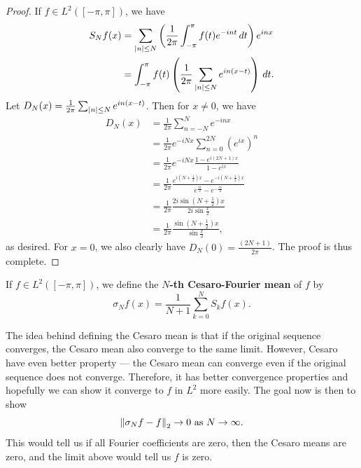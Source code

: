 \documentclass[a4paper]{article}
\begin{document}
\begin{proof}
  If $f \in L^2([- \pi, \pi])$, we have
  \[
    \begin{aligned}
      S_N f(x)
       & = \sum_{\left\lvert n\right\rvert \leq N} \left( \frac{1}{2\pi}
      \int_{- \pi}^\pi f(t) e^{- i n t} \, d t \right) e^{i n x} \\
       & = \int_{-\pi}^\pi f(t) \left( \frac{1}{2\pi}
      \sum_{\left\lvert n\right\rvert \leq N} e^{i n (x - t)} \right) \, d t.
    \end{aligned}
  \]
  Let $D_N(x) = \frac{1}{2\pi}
    \sum_{\left\lvert n\right\rvert \leq N} e^{i n (x - t)}$.
  Then for $x \neq 0$, we have
  \[
    \begin{aligned}
      D_N(x)
       & = \frac{1}{2\pi} \sum_{n=-N}^{N}
      e^{- i n x}                                                             \\
       & = \frac{1}{2\pi} e^{- i N x} \sum_{n=0}^{2N}
      \left( e^{i x} \right)^n                                                \\
       & = \frac{1}{2\pi} e^{- i N x}
      \frac{1 - e^{i (2N+1) x}}{1 - e^{i x}}                                  \\
       & = \frac{1}{2\pi} \frac{e^{i (N + \frac{1}{2}) x}
                            - e^{- i (N + \frac{1}{2}) x}}{e^{\frac{ix}{2}} -
                            e^{-\frac{ix}{2}}} \\
       & = \frac{1}{2\pi} \frac{2 i \sin (N + \frac{1}{2})x}
                          {2i \sin \frac{x}{2}}                   \\
       & = \frac{1}{2\pi} \frac{\sin (N + \frac{1}{2})x}
                          {\sin \frac{x}{2}},
    \end{aligned}
  \]
  as desired. For $x = 0$, we also clearly have
  $D_N(0) = \frac{(2N+1)}{2\pi}$. The proof is thus
  complete.
\end{proof}

\begin{defi}
  If $f \in L^2([-\pi, \pi])$, we define the
  \textbf{$N$-th Cesaro-Fourier mean} of $f$ by
  \[
    \sigma_N f(x) = \frac{1}{N+1} \sum_{k=0}^N
    S_k f(x).
  \]
\end{defi}

The idea behind defining the Cesaro mean is that
if the original sequence converges, the Cesaro mean
also converge to the same limit. However, Cesaro
have even better property --- the Cesaro mean
can converge even if the original sequence does not
converge. Therefore, it has better convergence properties
and hopefully we can show it converge to $f$ in $L^2$ more
easily. The goal now is then to show
\[
  \left\lVert \sigma_N f - f\right\rVert_2 \to 0 \text{ as $N \to \infty$}.
\]
This would tell us if all Fourier coefficients are zero,
then the Cesaro means are zero, and the limit above
would tell us $f$ is zero.
\end{document}
